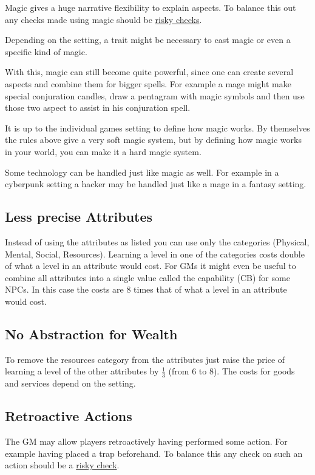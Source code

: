 \documentclass[11pt]{article}
\begin{document}
{Magic gives a huge narrative flexibility to explain aspects. To balance this out any checks made using magic should be \hyperref[sec:org8b0c4a4]{risky checks}.

Depending on the setting, a trait might be necessary to cast magic or even a specific kind of magic.

With this, magic can still become quite powerful, since one can create several aspects and combine them for bigger spells. For example a mage might make special conjuration candles, draw a pentagram with magic symbols and then use those two aspect to assist in his conjuration spell.

It is up to the individual games setting to define how magic works. By themselves the rules above give a very soft magic system, but by defining how magic works in your world, you can make it a hard magic system.

Some technology can be handled just like magic as well. For example in a cyberpunk setting a hacker may be handled just like a mage in a fantasy setting.
\subsection{Less precise Attributes}
\label{sec:orga4fb8d9}
Instead of using the attributes as listed you can use only the categories (Physical, Mental, Social, Resources). Learning a level in one of the categories costs double of what a level in an attribute would cost.
For GMs it might even be useful to combine all attributes into a single value called the capability (CB) for some NPCs. In this case the costs are 8 times that of what a level in an attribute would cost.
\subsection{No Abstraction for Wealth}
\label{sec:org3c1c247}

To remove the resources category from the attributes just raise the price of learning a level of the other attributes by \(\frac{1}{3}\) (from 6 to 8). The costs for goods and services
depend on the setting.
\subsection{Retroactive Actions}
\label{sec:orgdbf1930}

The GM may allow players retroactively having performed some action. For example having placed a trap beforehand. To balance this any check on such an action should be a \hyperref[sec:org8b0c4a4]{risky check}.
}
\end{document}
